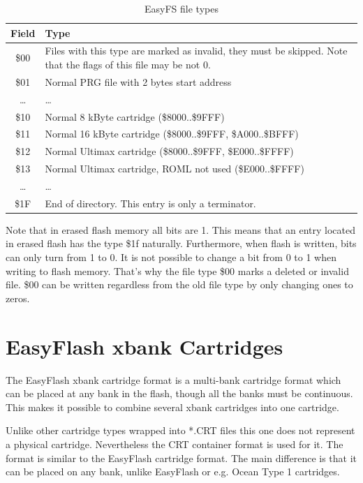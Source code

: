 \documentclass[a4paper,oneside]{memoir}
\begin{document}
\begin{table}[!htbp]
    \centering
    \begin{tabularx}{\textwidth}{ cX }
        \toprule
        Field & Type \\
        \midrule
        \$00 & Files with this type are marked as invalid, they must be
        skipped. Note that the flags of this file may be not 0. \\[3pt] \$01 &
        Normal PRG file with 2 bytes start address \\[3pt] \ldots & \ldots \\[3pt]
        \$10 & Normal 8 kByte cartridge (\$8000..\$9FFF) \\[3pt]
        \$11 & Normal 16 kByte cartridge (\$8000..\$9FFF, \$A000..\$BFFF) \\[3pt]
        \$12 & Normal Ultimax cartridge (\$8000..\$9FFF, \$E000..\$FFFF) \\[3pt]
        \$13 & Normal Ultimax cartridge, ROML not used (\$E000..\$FFFF) \\[3pt]
        \ldots & \ldots \\[3pt]
        \$1F & End of directory. This entry is only a terminator. \\[3pt]
        \bottomrule
    \end{tabularx}
    \caption{EasyFS file types}
    \label{tab:easyfs-file-types}
\end{table}

Note that in erased flash memory all bits are 1. This means that an entry
located in erased flash has the type \$1f naturally. Furthermore, when flash is
written, bits can only turn from 1 to 0. It is not possible to change a bit
from 0 to 1 when writing to flash memory. That's why the file type \$00 marks a
deleted or invalid file. \$00 can be written regardless from the old file type
by only changing ones to zeros.

\chapter{EasyFlash xbank Cartridges}

The EasyFlash xbank cartridge format is a multi-bank cartridge format which can
be placed at any bank in the flash, though all the banks must be continuous.
This makes it possible to combine several xbank cartridges into one cartridge.

Unlike other cartridge types wrapped into *.CRT files this one does not
represent a physical cartridge. Nevertheless the CRT container format is used
for it. The format is similar to the EasyFlash cartridge format. The main
difference is that it can be placed on any bank, unlike EasyFlash or e.g. Ocean
Type 1 cartridges.
\end{document}

